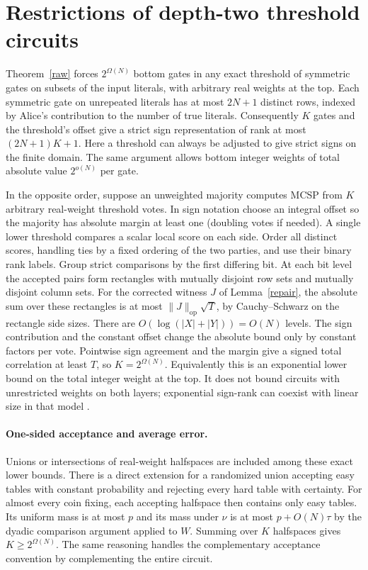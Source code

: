 \documentclass[11pt]{article}
\begin{document}
\section{Restrictions of depth-two threshold circuits}
Theorem~\ref{raw} forces $2^{\Omega(N)}$ bottom gates in any exact threshold of symmetric gates on subsets of the input literals, with arbitrary real weights at the top. Each symmetric gate on unrepeated literals has at most $2N+1$ distinct rows, indexed by Alice's contribution to the number of true literals. Consequently $K$ gates and the threshold's offset give a strict sign representation of rank at most $(2N+1)K+1$. Here a threshold can always be adjusted to give strict signs on the finite domain. The same argument allows bottom integer weights of total absolute value $2^{o(N)}$ per gate.

In the opposite order, suppose an unweighted majority computes MCSP from $K$ arbitrary real-weight threshold votes. In sign notation choose an integral offset so the majority has absolute margin at least one (doubling votes if needed). A single lower threshold compares a scalar local score on each side. Order all distinct scores, handling ties by a fixed ordering of the two parties, and use their binary rank labels. Group strict comparisons by the first differing bit. At each bit level the accepted pairs form rectangles with mutually disjoint row sets and mutually disjoint column sets. For the corrected witness $J$ of Lemma~\ref{repair}, the absolute sum over these rectangles is at most $\|J\|_{\mathrm{op}}\sqrt T$, by Cauchy--Schwarz on the rectangle side sizes. There are $O(\log(|X|+|Y|))=O(N)$ levels. The sign contribution and the constant offset change the absolute bound only by constant factors per vote. Pointwise sign agreement and the margin give a signed total correlation at least $T$, so $K=2^{\Omega(N)}$. Equivalently this is an exponential lower bound on the total integer weight at the top. It does not bound circuits with unrestricted weights on both layers; exponential sign-rank can coexist with linear size in that model \cite{am}.

\paragraph{One-sided acceptance and average error.}
Unions or intersections of real-weight halfspaces are included among these exact lower bounds. There is a direct extension for a randomized union accepting easy tables with constant probability and rejecting every hard table with certainty. For almost every coin fixing, each accepting halfspace then contains only easy tables. Its uniform mass is at most $p$ and its mass under $\nu$ is at most $p+O(N)\tau$ by the dyadic comparison argument applied to $W$. Summing over $K$ halfspaces gives $K\ge 2^{\Omega(N)}$. The same reasoning handles the complementary acceptance convention by complementing the entire circuit.
\end{document}
